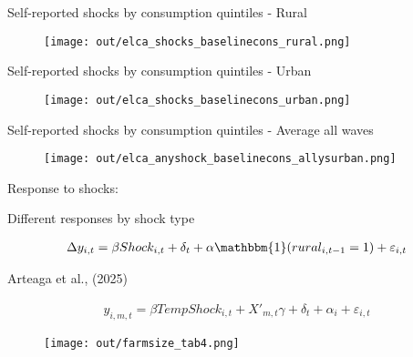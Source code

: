 \documentclass[aspectratio = 169]{beamer}
\begin{document}
\begin{frame}{Self-reported shocks by consumption quintiles - Rural}

	\begin{figure}
		\texttt{[image: out/elca\_shocks\_baselinecons\_rural.png]}
   \end{figure}   

\end{frame}

\begin{frame}{Self-reported shocks by consumption quintiles - Urban}

	\begin{figure}
		\texttt{[image: out/elca\_shocks\_baselinecons\_urban.png]}
   \end{figure}   

\end{frame}

\begin{frame}{Self-reported shocks by consumption quintiles - Average all waves}

	\begin{figure}
		\texttt{[image: out/elca\_anyshock\_baselinecons\_allysurban.png]}
   \end{figure}   

\end{frame}

\begin{frame}[c]{}        
	\centering
	\large Response to shocks:
\end{frame}
  
\begin{frame}{Different responses by shock type}

	\begin{align*} 
	    \Delta y_{i, t} = \beta Shock_{i,t} + \delta_{t} + \alpha \mathbbm{1}(rural_{i,t-1}=1) + \varepsilon_{i,t}
	\end{align*}

 	\centering
 	\scalebox{0.8}{}
 	\medskip

\end{frame}

\begin{frame}{Arteaga et al., (2025)}

	\vspace{-20pt}
	\begin{align*} 
	y_{i, m, t} = \beta TempShock_{i,t} + X'_{m,t}\gamma + \delta_{t} + \alpha_{i} + \varepsilon_{i,t}
	\end{align*}

   \vspace{-10pt}
   \begin{figure}
		\texttt{[image: out/farmsize\_tab4.png]}
   \end{figure}   

\end{frame}
\end{document}
